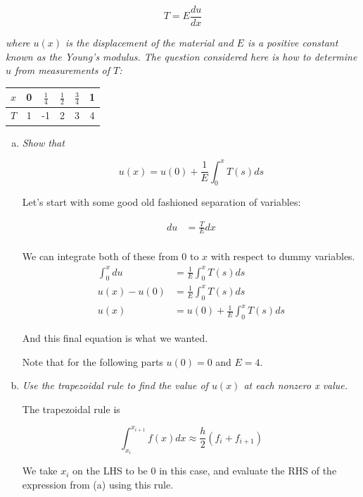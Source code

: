 \documentclass{article}
\begin{document}
$$T = E \frac{du}{dx}$$

\noindent\textit{where $u(x)$ is the displacement of the material and $E$ is a positive constant known as the Young's modulus. The question considered here is how to determine $u$ from measurements of $T$:}

\begin{table}[h!]
  \centering
  \begin{tabular} {c | c c c c c }
    $x$ & 0 & $\frac{1}{4}$ & $\frac{1}{2}$ & $\frac{3}{4}$ & 1 \\ 
    \hline  
    $T$ & 1 & -1 & 2 & 3 & 4 \\
  \end{tabular}
\end{table}


\begin{enumerate}[(a)]
  \item \textit{Show that}

    $$u(x) = u(0) + \frac{1}{E}\int_0^x T(s)ds$$

    Let's start with some good old fashioned separation of variables:

    \begin{align*}
      du &= \frac{T}{E}dx \\
    \end{align*}

    We can integrate both of these from 0 to $x$ with respect to dummy variables.
    \begin{align*}
      \int_0^x du &= \frac{1}{E} \int_0^x T(s)ds \\
      u(x) - u(0) &= \frac{1}{E} \int_0^x T(s)ds \\
      u(x) &= u(0) + \frac{1}{E} \int_0^x T(s)ds
    \end{align*}

    And this final equation is what we wanted.

    Note that for the following parts $u(0) = 0$ and $E = 4$.
  \item \textit{Use the trapezoidal rule to find the value of $u(x)$ at each nonzero x value.}

    The trapezoidal rule is 

    $$\int_{x_i}^{x_{i+1}} f(x)dx \approx \frac{h}{2}(f_i + f_{i+1})$$

    We take $x_i$ on the LHS to be 0 in this case, and evaluate the RHS of the expression from (a) using this rule.


\end{enumerate}
\end{document}
